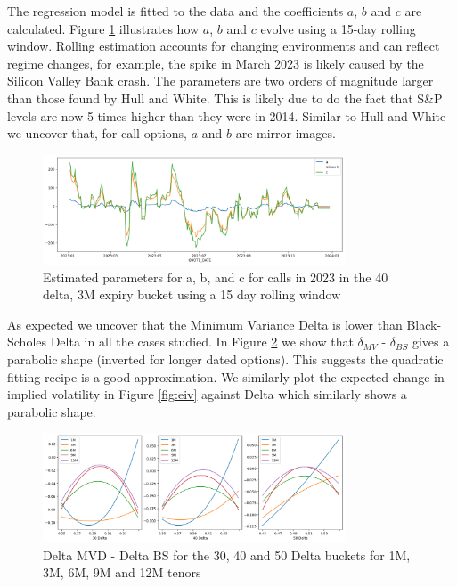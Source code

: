 \documentclass{article}
\begin{document}
The regression model is fitted to the data and the coefficients $a$, $b$ and $c$ are calculated.  Figure \ref{fig:a_b_c} illustrates how $a$, $b$ and $c$ evolve using a 15-day rolling window.
Rolling estimation accounts for changing environments and can reflect regime changes, for example, the spike in March 2023 is likely caused by the Silicon Valley Bank crash.  The parameters are
two orders of magnitude larger than those found by Hull and White. This is likely due to do the fact that S\&P levels are now 5 times higher than they were in 2014. Similar to Hull and White
\cite{hull} we uncover that, for call options, $a$ and $b$ are mirror images.

\begin{figure}[h]
    \centering
    \includegraphics[width=0.8\textwidth]{images/a_b_c.png}
    \caption{Estimated parameters for a, b, and c for calls in 2023 in the 40 delta, 3M expiry bucket using a 15 day rolling window}
    \label{fig:a_b_c}
\end{figure}

As expected we uncover that the Minimum Variance Delta is lower than Black-Scholes Delta in all the cases studied. In Figure \ref{fig:mvd-bs} we show that
$\delta_{MV}$ - $\delta_{BS}$ gives a parabolic shape (inverted for longer dated options). This suggests the quadratic fitting recipe is a good approximation.
We similarly plot the expected change in implied volatility in Figure \ref{fig:eiv} against Delta which similarly shows a parabolic shape.

\begin{figure}[h]
    \centering
    \includegraphics[width=0.8\textwidth]{images/mvd-bs.png}
    \caption{Delta MVD - Delta BS for the 30, 40 and 50 Delta buckets for 1M, 3M, 6M, 9M and 12M tenors}
    \label{fig:mvd-bs}
\end{figure}
\end{document}
